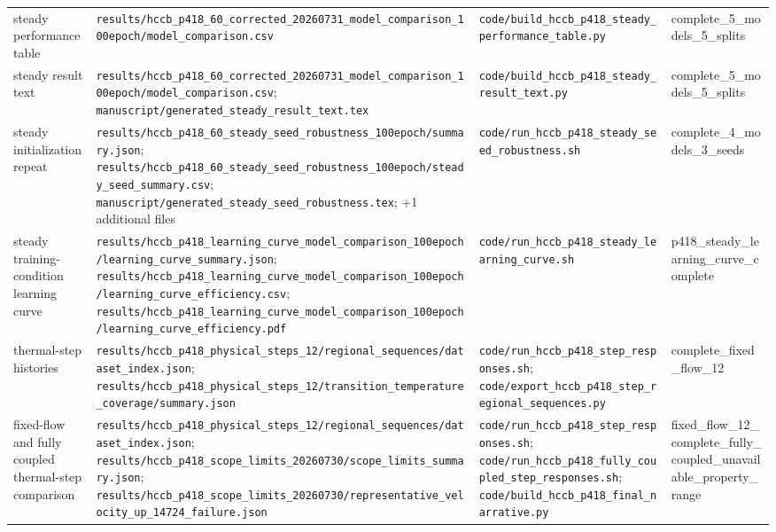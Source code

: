 \begin{longtable}{>{\raggedright\arraybackslash}p{2.8cm}>{\raggedright\arraybackslash}p{6.6cm}>{\raggedright\arraybackslash}p{6.4cm}>{\raggedright\arraybackslash}p{2.4cm}}
steady performance table & \nolinkurl{results/hccb_p418_60_corrected_20260731_model_comparison_100epoch/model_comparison.csv} & \nolinkurl{code/build_hccb_p418_steady_performance_table.py} & complete\_\allowbreak{}5\_\allowbreak{}models\_\allowbreak{}5\_\allowbreak{}splits \\
steady result text & \nolinkurl{results/hccb_p418_60_corrected_20260731_model_comparison_100epoch/model_comparison.csv}; \nolinkurl{manuscript/generated_steady_result_text.tex} & \nolinkurl{code/build_hccb_p418_steady_result_text.py} & complete\_\allowbreak{}5\_\allowbreak{}models\_\allowbreak{}5\_\allowbreak{}splits \\
steady initialization repeat & \nolinkurl{results/hccb_p418_60_steady_seed_robustness_100epoch/summary.json}; \nolinkurl{results/hccb_p418_60_steady_seed_robustness_100epoch/steady_seed_summary.csv}; \nolinkurl{manuscript/generated_steady_seed_robustness.tex}; +1 additional files & \nolinkurl{code/run_hccb_p418_steady_seed_robustness.sh} & complete\_\allowbreak{}4\_\allowbreak{}models\_\allowbreak{}3\_\allowbreak{}seeds \\
steady training-condition learning curve & \nolinkurl{results/hccb_p418_learning_curve_model_comparison_100epoch/learning_curve_summary.json}; \nolinkurl{results/hccb_p418_learning_curve_model_comparison_100epoch/learning_curve_efficiency.csv}; \nolinkurl{results/hccb_p418_learning_curve_model_comparison_100epoch/learning_curve_efficiency.pdf} & \nolinkurl{code/run_hccb_p418_steady_learning_curve.sh} & p418\_\allowbreak{}steady\_\allowbreak{}learning\_\allowbreak{}curve\_\allowbreak{}complete \\
thermal-step histories & \nolinkurl{results/hccb_p418_physical_steps_12/regional_sequences/dataset_index.json}; \nolinkurl{results/hccb_p418_physical_steps_12/transition_temperature_coverage/summary.json} & \nolinkurl{code/run_hccb_p418_step_responses.sh}; \nolinkurl{code/export_hccb_p418_step_regional_sequences.py} & complete\_\allowbreak{}fixed\_\allowbreak{}flow\_\allowbreak{}12 \\
fixed-flow and fully coupled thermal-step comparison & \nolinkurl{results/hccb_p418_physical_steps_12/regional_sequences/dataset_index.json}; \nolinkurl{results/hccb_p418_scope_limits_20260730/scope_limits_summary.json}; \nolinkurl{results/hccb_p418_scope_limits_20260730/representative_velocity_up_14724_failure.json} & \nolinkurl{code/run_hccb_p418_step_responses.sh}; \nolinkurl{code/run_hccb_p418_fully_coupled_step_responses.sh}; \nolinkurl{code/build_hccb_p418_final_narrative.py} & fixed\_\allowbreak{}flow\_\allowbreak{}12\_\allowbreak{}complete\_\allowbreak{}fully\_\allowbreak{}coupled\_\allowbreak{}unavailable\_\allowbreak{}property\_\allowbreak{}range \\

\end{longtable}
